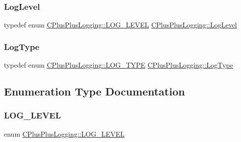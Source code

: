 \subsubsection{\texorpdfstring{Log\+Level}{LogLevel}}
{\footnotesize\ttfamily typedef enum \mbox{\hyperlink{namespace_c_plus_plus_logging_a446fbaa84d9267b4029b9a521fe842f7}{C\+Plus\+Plus\+Logging\+::\+L\+O\+G\+\_\+\+L\+E\+V\+EL}} \mbox{\hyperlink{namespace_c_plus_plus_logging_af665d4fd4cbfd995a475e01ee59870ac}{C\+Plus\+Plus\+Logging\+::\+Log\+Level}}}

\mbox{\label{namespace_c_plus_plus_logging_a4dae38037c368f31976e9db62903ac0d}} 
\subsubsection{\texorpdfstring{Log\+Type}{LogType}}
{\footnotesize\ttfamily typedef enum \mbox{\hyperlink{namespace_c_plus_plus_logging_a41792ca32aae5ea9a56c7c7578251a76}{C\+Plus\+Plus\+Logging\+::\+L\+O\+G\+\_\+\+T\+Y\+PE}} \mbox{\hyperlink{namespace_c_plus_plus_logging_a4dae38037c368f31976e9db62903ac0d}{C\+Plus\+Plus\+Logging\+::\+Log\+Type}}}



\subsection{Enumeration Type Documentation}
\mbox{\label{namespace_c_plus_plus_logging_a446fbaa84d9267b4029b9a521fe842f7}} 
\subsubsection{\texorpdfstring{L\+O\+G\+\_\+\+L\+E\+V\+EL}{LOG\_LEVEL}}
{\footnotesize\ttfamily enum \mbox{\hyperlink{namespace_c_plus_plus_logging_a446fbaa84d9267b4029b9a521fe842f7}{C\+Plus\+Plus\+Logging\+::\+L\+O\+G\+\_\+\+L\+E\+V\+EL}}}

